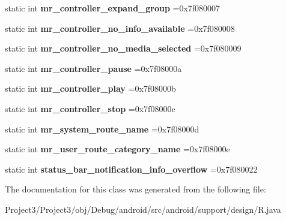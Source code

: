 \begin{DoxyCompactItemize}
\mbox{\label{classandroid_1_1support_1_1design_1_1R_1_1string_a6b212f8746d8f15b763d349ea4459216}} 
static int {\bfseries mr\+\_\+controller\+\_\+expand\+\_\+group} =0x7f080007
\item 
\mbox{\label{classandroid_1_1support_1_1design_1_1R_1_1string_acdf7757709b4bd733ab0723a49839bcb}} 
static int {\bfseries mr\+\_\+controller\+\_\+no\+\_\+info\+\_\+available} =0x7f080008
\item 
\mbox{\label{classandroid_1_1support_1_1design_1_1R_1_1string_a7d939bddb74dcb61ca3a21652f24b8a5}} 
static int {\bfseries mr\+\_\+controller\+\_\+no\+\_\+media\+\_\+selected} =0x7f080009
\item 
\mbox{\label{classandroid_1_1support_1_1design_1_1R_1_1string_a2c6b5b4052ac6cb95a575e51c63fae89}} 
static int {\bfseries mr\+\_\+controller\+\_\+pause} =0x7f08000a
\item 
\mbox{\label{classandroid_1_1support_1_1design_1_1R_1_1string_a7515f5592004ba882efad1f539899b9b}} 
static int {\bfseries mr\+\_\+controller\+\_\+play} =0x7f08000b
\item 
\mbox{\label{classandroid_1_1support_1_1design_1_1R_1_1string_a7b52759b359070bdd293621d4a3ca1a9}} 
static int {\bfseries mr\+\_\+controller\+\_\+stop} =0x7f08000c
\item 
\mbox{\label{classandroid_1_1support_1_1design_1_1R_1_1string_a3b7de40492591994e369b790c2bc3d2e}} 
static int {\bfseries mr\+\_\+system\+\_\+route\+\_\+name} =0x7f08000d
\item 
\mbox{\label{classandroid_1_1support_1_1design_1_1R_1_1string_a209226f7a20a633000648f28731a5c87}} 
static int {\bfseries mr\+\_\+user\+\_\+route\+\_\+category\+\_\+name} =0x7f08000e
\item 
\mbox{\label{classandroid_1_1support_1_1design_1_1R_1_1string_a97cc1924eef5a05b0ba9c6b686629521}} 
static int {\bfseries status\+\_\+bar\+\_\+notification\+\_\+info\+\_\+overflow} =0x7f080022
\end{DoxyCompactItemize}


The documentation for this class was generated from the following file\+:\begin{DoxyCompactItemize}
\item 
Project3/\+Project3/obj/\+Debug/android/src/android/support/design/R.\+java\end{DoxyCompactItemize}
